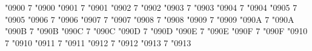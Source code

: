 \newcommand*{\chemgamma}{\textrm{γ}}
\newcommand*{\chemdelta}{\textrm{δ}}
\newcommand*{\chemepsilon}{\textrm{ε}}
\newcommand*{\chemzeta}{\textrm{ζ}}
\newcommand*{\chemeta}{\textrm{η}}
\newcommand*{\chemtheta}{\textrm{θ}}
\newcommand*{\chemiota}{\textrm{ι}}
\newcommand*{\chemkappa}{\textrm{\char"03F0}}
\newcommand*{\chemlambda}{\textrm{λ}}
\newcommand*{\chemmu}{\textrm{μ}}
\newcommand*{\chemnu}{\textrm{ν}}
\newcommand*{\chemxi}{\textrm{ξ}}
\newcommand*{\chemomicron}{\textrm{ο}}
\newcommand*{\chempi}{\textrm{π}}
\newcommand*{\chemrho}{\textrm{ρ}}
\newcommand*{\chemrhoalt}{\textrm{\char"03F1}}
\newcommand*{\chemsigma}{\textrm{σ}}
\newcommand*{\chemsigmaalt}{\textrm{ς}}
\newcommand*{\chemtau}{\textrm{τ}}
\newcommand*{\chemupsilon}{\textrm{υ}}
\newcommand*{\chemphi}{\textrm{φ}}
\newcommand*{\chemchi}{\textrm{χ}}
\newcommand*{\chempsi}{\textrm{ψ}}
\newcommand*{\chemomega}{\textrm{ω}}
%
\newcommand*{\chemAlpha}{\textrm{Α}}
\newcommand*{\chemBeta}{\textrm{Β}}
\newcommand*{\chemGamma}{\textrm{Γ}}
\newcommand*{\chemDelta}{\textrm{Δ}}
\newcommand*{\chemEpsilon}{\textrm{Ε}}
\newcommand*{\chemZeta}{\textrm{Ζ}}
\newcommand*{\chemEta}{\textrm{Η}}
\newcommand*{\chemTheta}{\textrm{Θ}}
\newcommand*{\chemIota}{\textrm{Ι}}
\newcommand*{\chemKappa}{\textrm{Κ}}
\newcommand*{\chemLambda}{\textrm{Λ}}
\newcommand*{\chemMu}{\textrm{Μ}}
\newcommand*{\chemNu}{\textrm{Ν}}
\newcommand*{\chemXi}{\textrm{Ξ}}
\newcommand*{\chemOmicron}{\textrm{Ο}}
\newcommand*{\chemPi}{\textrm{Π}}
\newcommand*{\chemRho}{\textrm{Ρ}}
\newcommand*{\chemSigma}{\textrm{Σ}}
\newcommand*{\chemTau}{\textrm{Τ}}
\newcommand*{\chemUpsilon}{\textrm{Υ}}
\newcommand*{\chemPhi}{\textrm{Φ}}
\newcommand*{\chemChi}{\textrm{Χ}}
\newcommand*{\chemPsi}{\textrm{Ψ}}
\newcommand*{\chemOmega}{\textrm{Ω}}
%
\Umathcode "0900 7 \symoperators "0900%
\Umathcode "0901 7 \symoperators "0901%
\Umathcode "0902 7 \symoperators "0902%
\Umathcode "0903 7 \symoperators "0903%
\Umathcode "0904 7 \symoperators "0904%
\Umathcode "0905 7 \symoperators "0905%
\Umathcode "0906 7 \symoperators "0906%
\Umathcode "0907 7 \symoperators "0907%
\Umathcode "0908 7 \symoperators "0908%
\Umathcode "0909 7 \symoperators "0909%
\Umathcode "090A 7 \symoperators "090A%
\Umathcode "090B 7 \symoperators "090B%
\Umathcode "090C 7 \symoperators "090C%
\Umathcode "090D 7 \symoperators "090D%
\Umathcode "090E 7 \symoperators "090E%
\Umathcode "090F 7 \symoperators "090F%
%
\Umathcode "0910 7 \symoperators "0910%
\Umathcode "0911 7 \symoperators "0911%
\Umathcode "0912 7 \symoperators "0912%
\Umathcode "0913 7 \symoperators "0913%
